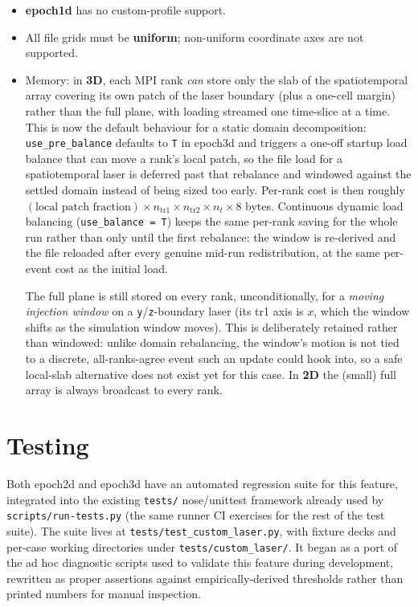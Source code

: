 \documentclass[11pt,a4paper]{article}
\begin{document}
\begin{itemize}
  \item \textbf{epoch1d} has no custom-profile support.
  \item All file grids must be \textbf{uniform}; non-uniform coordinate
    axes are not supported.
  \item Memory: in \textbf{3D}, each MPI rank \emph{can} store only the
    slab of the spatiotemporal array covering its own patch of the laser
    boundary (plus a one-cell margin) rather than the full plane, with
    loading streamed one time-slice at a time. This is now the default
    behaviour for a static domain decomposition: \texttt{use\_pre\_balance}
    defaults to \texttt{T} in epoch3d and triggers a one-off startup load
    balance that can move a rank's local patch, so the file load for a
    spatiotemporal laser is deferred past that rebalance and windowed
    against the settled domain instead of being sized too early.
    Per-rank cost is then roughly $(\text{local patch fraction}) \times
    n_{\mathrm{tr1}} \times n_{\mathrm{tr2}} \times n_t \times 8$ bytes.
    Continuous dynamic load balancing (\texttt{use\_balance = T}) keeps
    the same per-rank saving for the whole run rather than only until
    the first rebalance: the window is re-derived and the file reloaded
    after every genuine mid-run redistribution, at the same per-event
    cost as the initial load.

    The full plane is still stored on every rank, unconditionally, for
    a \emph{moving injection window} on a \texttt{y}/\texttt{z}-boundary
    laser (its tr1 axis is $x$, which the window shifts as the
    simulation window moves). This is deliberately retained rather than
    windowed: unlike domain rebalancing, the window's motion is not
    tied to a discrete, all-ranks-agree event such an update could hook
    into, so a safe local-slab alternative does not exist yet for this
    case. In \textbf{2D} the (small) full array is always broadcast to
    every rank.
\end{itemize}

\section{Testing}

Both epoch2d and epoch3d have an automated regression suite for this
feature, integrated into the existing \texttt{tests/} nose/unittest
framework already used by \texttt{scripts/run-tests.py} (the same
runner CI exercises for the rest of the test suite). The suite lives
at \texttt{tests/test\_custom\_laser.py}, with fixture decks and
per-case working directories under \texttt{tests/custom\_laser/}. It
began as a port of the ad hoc diagnostic scripts used to validate this
feature during development, rewritten as proper assertions against
empirically-derived thresholds rather than printed numbers for manual
inspection.
\end{document}

